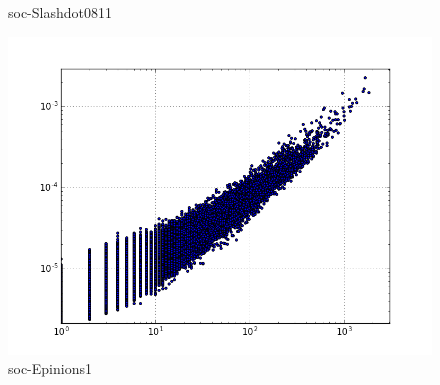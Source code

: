 \begin{figure}[H]
  \caption*{soc-Slashdot0811}
\endminipage\hfill
{}
  \includegraphics[width=\linewidth]{img/soc-E/degreeVSpagerank.png}
  \caption*{soc-Epinions1}
\endminipage
\end{figure}

